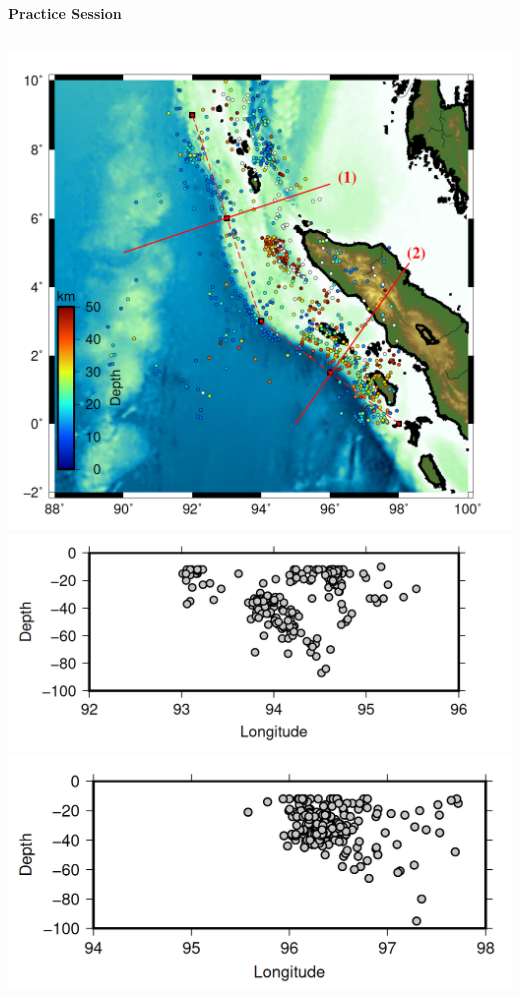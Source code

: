 \documentclass[11pt]{beamer}
\begin{document}
\begin{frame}{\textbf{Practice Session}}
        \begin{columns}[t]
                \includegraphics[width=1\linewidth]{images/sumatra}
                \includegraphics[width=1\linewidth]{images/projection2.png} \\
                \includegraphics[width=1\linewidth]{images/projection3.png}
        \end{columns}
\end{frame}
\end{document}
